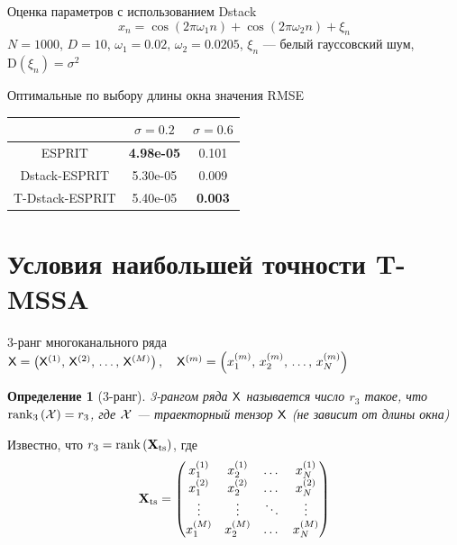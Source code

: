 \documentclass[pdf, unicode, 10pt, notheorems, handout]{beamer}
\newcommand{\bluetext}[1]{{\usebeamercolor[fg]{bluetext_color}#1}}
\newcommand{\rank}{\operatorname{rank}}
\newtheorem{definition}{Определение}
\begin{document}
\begin{frame}{Оценка параметров с использованием Dstack}
  \vspace*{-0.3cm}
  \[
    x_{n} = \cos(2 \pi \omega_1 n) +
    \cos(2 \pi \omega_2 n) + \xi_n
  \]
  $N = 1000$, $D=10$, $\omega_1 = 0.02,\, \omega_2 = 0.0205$, $\xi_n$ --- белый
  гауссовский шум, $\mathrm{D}(\xi_n) = \sigma^2$

  \medskip

  \begin{table}
    \centering
    \bluetext{Оптимальные по выбору длины окна значения RMSE}

    \begin{tabular}{c|c||c}
      \hline
      & $\sigma = 0.2$ & $\sigma = 0.6$ \\\hline
      ESPRIT & \textbf{4.98e-05} & 0.101 \\\hline
      Dstack-ESPRIT & 5.30e-05 & 0.009 \\\hline
      T-Dstack-ESPRIT & 5.40e-05 & \textbf{0.003} \\\hline
    \end{tabular}
  \end{table}
\end{frame}

\section{Условия наибольшей точности T-MSSA}
\begin{frame}{3-ранг многоканального ряда}
  $\mathsf{X} = \left(\mathsf{X}^{(1)},\, \mathsf{X}^{(2)}, \, \ldots,\,
  \mathsf{X}^{(M)}\right),\quad\mathsf{X}^{(m)} = \left(x_1^{(m)}, \, x_2^{(m)},\,\ldots,\,
  x_N^{(m)}\right)$
  \begin{definition}[3-ранг]
    3-рангом ряда $\mathsf{X}$ называется число $r_3$ такое, что
    $\rank_3\left(\calX\right) = r_3$, где $\mathcal{X}$ --- траекторный
    тензор $\mathsf{X}$ (не зависит от длины окна)
  \end{definition}

  \medskip

  Известно, что $r_3 = \rank\left(\bfX_{\mathrm{ts}}\right)$, где
  \[
    \mathbf{X}_{\mathrm{ts}} =
    \begin{pmatrix}
      x_1^{(1)} & x_2^{(1)} & \dots & x_N^{(1)}\\
      x_1^{(2)} & x_2^{(2)} & \dots & x_N^{(2)}\\
      \vdots & \vdots & \ddots & \vdots\\
      x_1^{(M)} & x_2^{(M)} & \dots & x_N^{(M)}
    \end{pmatrix}
  \]
\end{frame}
\end{document}

